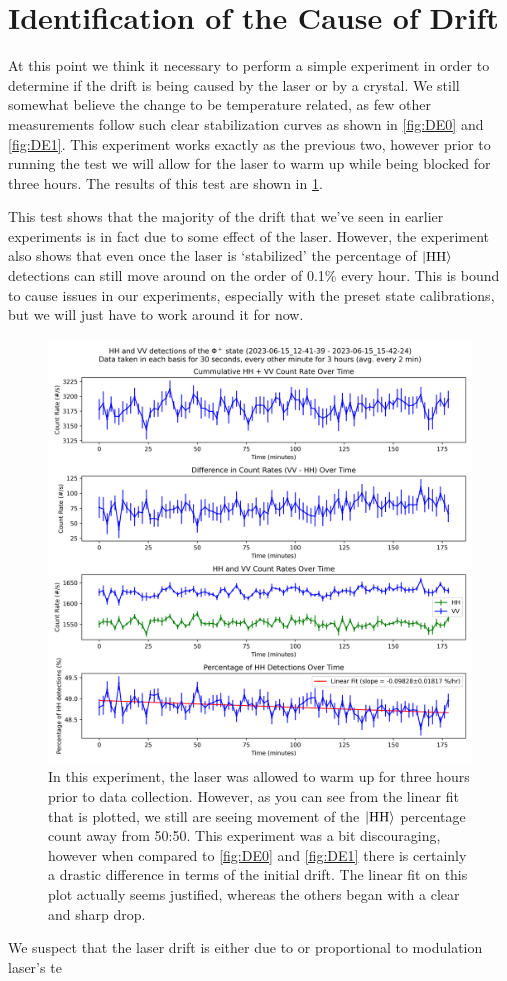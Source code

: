 \section{Identification of the Cause of Drift}

At this point we think it necessary to perform a simple experiment in order to determine if the drift is being caused by the laser or by a crystal. We still somewhat believe the change to be temperature related, as few other measurements follow such clear stabilization curves as shown in \cref{fig:DE0} and \cref{fig:DE1}. This experiment works exactly as the previous two, however prior to running the test we will allow for the laser to warm up while being blocked for three hours. The results of this test are shown in \cref{fig:DE2}.

This test shows that the majority of the drift that we've seen in earlier experiments is in fact due to some effect of the laser. However, the experiment also shows that even once the laser is `stabilized' the percentage of $\ket{\text{HH}}$ detections can still move around on the order of 0.1\% every hour. This is bound to cause issues in our experiments, especially with the preset state calibrations, but we will just have to work around it for now.

\begin{figure}
	\centering
	\includegraphics[width=\textwidth]{DE2_plot.png}	
	\caption{In this experiment, the laser was allowed to warm up for three hours prior to data collection. However, as you can see from the linear fit that is plotted, we still are seeing movement of the $\ket{\text{HH}}$ percentage count away from 50:50. This experiment was a bit discouraging, however when compared to \cref{fig:DE0} and \cref{fig:DE1} there is certainly a drastic difference in terms of the initial drift. The linear fit on this plot actually seems justified, whereas the others began with a clear and sharp drop.}
	\label{fig:DE2}
\end{figure}

We suspect that the laser drift is either due to or proportional to modulation laser's te






